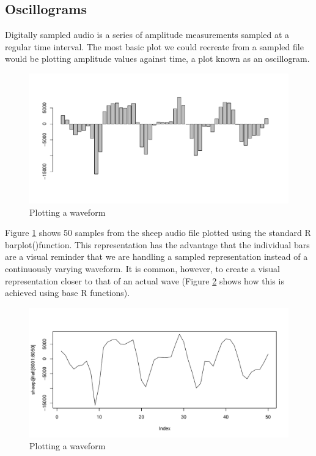 \documentclass[
]{book}
\begin{document}
\hypertarget{oscillograms}{%
\subsection{Oscillograms}\label{oscillograms}}

Digitally sampled audio is a series of amplitude measurements sampled at a regular time interval. The most basic plot we could recreate from a sampled file would be plotting amplitude values against time, a plot known as an oscillogram.

\begin{figure}

{\centering \includegraphics[width=0.9\linewidth]{_main_files/figure-latex/amplitude-bars-1} 

}

\caption{Plotting a waveform}\label{fig:amplitude-bars}
\end{figure}

Figure \ref{fig:amplitude-bars} shows 50 samples from the sheep audio file plotted using the standard R barplot()function. This representation has the advantage that the individual bars are a visual reminder that we are handling a sampled representation instead of a continuously varying waveform. It is common, however, to create a visual representation closer to that of an actual wave (Figure \ref{fig:amplitude-lines} shows how this is achieved using base R functions).

\begin{figure}

{\centering \includegraphics[width=0.9\linewidth]{_main_files/figure-latex/amplitude-lines-1} 

}

\caption{Plotting a waveform}\label{fig:amplitude-lines}
\end{figure}
\end{document}

